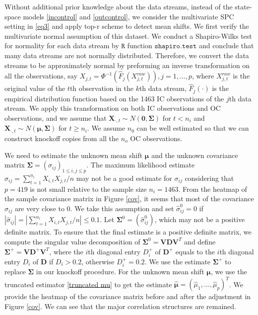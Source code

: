 \documentclass[]{interact}
\theoremstyle{plain}%
\theoremstyle{definition}
\theoremstyle{remark}
\begin{document}
Without additional prior knowledge about the data streams, instead of the state-space models \eqref{incontrol} and \eqref{outcontrol}, we consider the multivariate SPC setting in \eqref{eq3} and apply top-r scheme to detect mean shifts. We first verify the multivariate normal assumption of this dataset. We conduct a Shapiro-Wilks test for normality for each data stream by $\mathtt{R}$ function $\mathtt{shapiro.test}$ and conclude that many data streams are not normally distributed. Therefore, we convert the data streams to be approximately normal by preforming an inverse transformation on all the observations, say $X_{j,t}=\Phi^{-1}\left( \hat F_{j}(X_{j,t}^{raw})\right), j=1, \ldots, p$, where $X_{j,t}^{raw}$ is the original value of the $t$th observation in the $k$th data stream, $\hat F_{j}(\cdot)$ is the empirical distribution function based on the 1463 IC observations of the $j$th data stream. We apply this transformation on both IC observations and OC observations, and we assume that $\bm{X}_{\cdot,t}\sim N(\bm{0},\bm\Sigma)$ for $t<n_i$ and $\bm{X}_{\cdot,t}\sim N(\bm\mu,\bm\Sigma)$ for $t\geq n_i$. We assume $n_0$ can be well estimated so that we can construct knockoff copies from all the $n_o$ OC observations. 

We need to estimate the unknown mean shift $\bm\mu$ and the unknown covariance matrix $\bm\Sigma=(\sigma_{ij})_{1\leq i,j\leq p}$. The maximum likelihood estimate $\hat{\sigma}_{ij}=\sum_{t=1}^{n_i}X_{i,t}X_{j,t}/n$ may not be a good estimate for $\sigma_{ij}$ considering that $p=419$ is not small relative to the sample size $n_i=1463$. From the heatmap of the sample covariance matrix in Figure \ref{cov}, it seems that most of the covariance $\sigma_{ij}$ are very close to 0. We take this assumption and set $\hat{\sigma}_{ij}^0=0$ if $|\hat{\sigma}_{ij}|=|\sum_{t=1}^{n_i}X_{i,t}X_{j,t}/n|\leq 0.1$. Let $\bm\Sigma^0=(\hat{\sigma}_{ij}^0)$, which may not be a positive definite matrix. To ensure that the final estimate is a positive definite matrix, we compute the singular value decomposition of $\bm\Sigma^0=\bm V \bm D \bm V^T$ and define $\bm\Sigma^+=\bm V \bm{D}^+ \bm V^T$, where the $i$th diagonal entry $D^+_i$ of $\bm{D}^+$ equals to the $i$th diagonal entry $D_i$ of $\bm{D}$ if $D_i>0.2$, otherwise $D^+_i=0.2$. We use the estimate $\bm\Sigma^+$ to replace $\bm\Sigma$ in our knockoff procedure. For the unknown mean shift $\bm\mu$, we use the truncated estimator \eqref{truncated mu} to get the estimate $\hat{\bm\mu}=(\hat{\mu}_1,\ldots,\hat{\mu}_p)^T$. We provide the heatmap of the covariance matrix before and after the adjustment in Figure \ref{cov}. We can see that the major correlation structures are remained.
\end{document}
